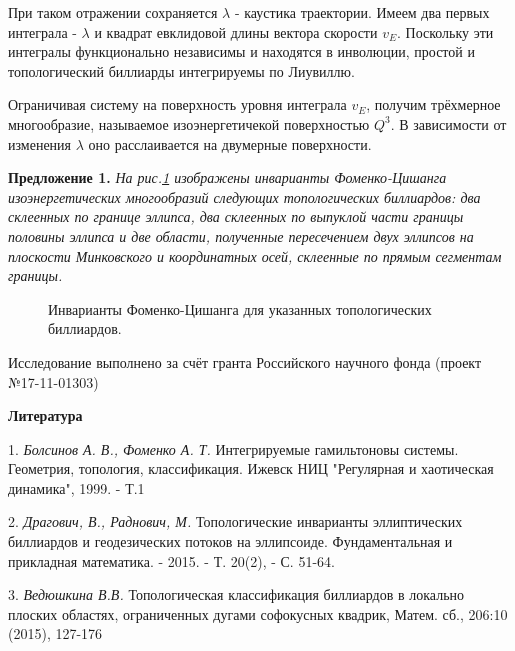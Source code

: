 

При таком отражении сохраняется $\lambda$ - каустика траектории. Имеем два первых интеграла - $\lambda$ и квадрат евклидовой длины вектора скорости $v_E$. Поскольку эти интегралы функционально независимы и находятся в инволюции, простой и топологический биллиарды интегрируемы по Лиувиллю.

Ограничивая систему на поверхность уровня интеграла $v_E$, получим трёхмерное многообразие, называемое изоэнергетичекой поверхностью $Q^3$. В зависимости от изменения $\lambda$ оно расслаивается на двумерные поверхности.


\textbf{Предложение 1.} {\it На рис.\ref{ex} изображены инварианты Фоменко-Цишанга изоэнергетических многообразий следующих топологических биллиардов: два склеенных по границе эллипса, два склеенных по выпуклой части границы половины эллипса и две области, полученные пересечением двух эллипсов на плоскости Минковского и координатных осей, склеенные по прямым сегментам границы.}

\begin{figure}[h!]
		\vspace*{-0.8 cm}
		\caption{Инварианты Фоменко-Цишанга для указанных топологических биллиардов.}\label{ex}
	\end{figure}

Исследование выполнено за счёт гранта Российского научного фонда (проект №17-11-01303)

\smallskip \centerline{\bf Литература} \nopagebreak

1. {\it Болсинов А. В., Фоменко А. Т.} Интегрируемые гамильтоновы системы. Геометрия, топология, классификация.  Ижевск НИЦ "Регулярная и хаотическая динамика", 1999. - Т.1


2. {\it Драгович, В., Раднович, М.} Топологические инварианты эллиптических биллиардов и геодезических потоков на эллипсоиде. Фундаментальная и прикладная математика. - 2015. - Т. 20(2), -  С. 51-64.

3. {\it Ведюшкина В.В.} Топологическая классификация биллиардов в локально плоских областях,
ограниченных дугами софокусных квадрик, Матем. сб., 206:10 (2015), 127-176

